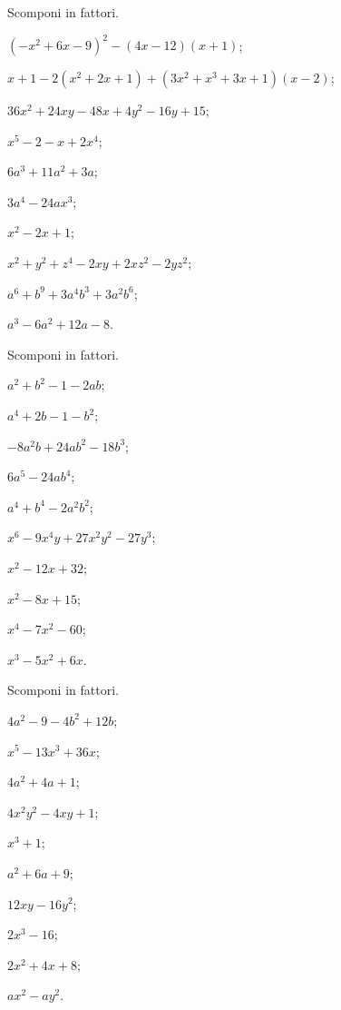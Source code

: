 \begin{esercizio}[\Ast]
 \label{ese:17.28}
 Scomponi in fattori.

 \begin{enumeratea}
\item $(-x^{2}+6x-9)^{2}-(4x-12)(x+1)$;
\item $x+1-2(x^{2}+2x+1)+(3x^{2}+x^{3}+3x+1)(x-2)$;
\item $36x^{2}+24xy-48x+4y^{2}-16y+15$;
\item $x^{5}-2-x+2x^{4}$;
\item $6a^{3}+11a^{2}+3a$;
\item $3a^{4}-24ax^{3}$;
\item $x^{2}-2x+1$;
\item $x^{2}+y^{2}+z^{4}-2xy+2{xz}^{2}-2{yz}^{2}$;
\item $a^{6}+b^{9}+3a^{4}b^{3}+3a^{2}b^{6}$;
\item $a^{3}-6a^{2}+12a-8$.
 \end{enumeratea}

\end{esercizio}


\begin{esercizio}
 Scomponi in fattori.
 \begin{multicols}{2}
 \begin{enumeratea}
 \item $a^{2}+b^{2}-1-2{ab}$;
\item $a^{4}+2b-1-b^{2}$;
\item $-8a^{2}b+24{ab}^{2}-18b^{3}$;
\item $6a^{5}-24{ab}^{4}$;
\item $a^{4}+b^{4}-2a^{2}b^{2}$;
\item $x^{6}-9x^{4}y+27x^{2}y^{2}-27y^{3}$;
\item $x^{2}-12x+32$;
\item $x^{2}-8x+15$;
\item $x^{4}-7x^{2}-60$;
\item $x^{3}-5x^{2}+6x$.
 \end{enumeratea}
 \end{multicols}
\end{esercizio}

\begin{esercizio}
 Scomponi in fattori.
 \begin{multicols}{2}
 \begin{enumeratea}
  \item $4a^{2}-9-4b^{2}+12b$;
\item $x^{5}-13x^{3}+36x$;
\item $4a^{2}+4a+1$;
\item $4x^{2}y^{2}-4xy+1$;
\item $x^{3}+1$;
\item $a^{2}+6a+9$;
\item $12xy-16y^{2}$;
\item $2x^{3}-16$;
\item $2x^{2}+4x+8$;
\item $ax^{2}-{ay}^{2}$.
 \end{enumeratea}
 \end{multicols}
\end{esercizio}

